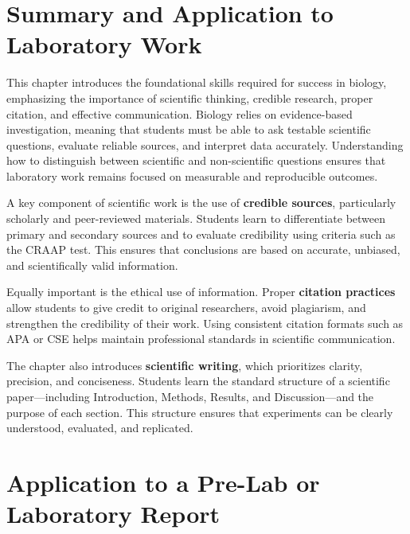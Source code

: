 \documentclass[
  letterpaper,
  DIV=11,
  numbers=noendperiod]{scrreprt}
\begin{document}
\section*{\texorpdfstring{\textbf{Summary and Application to Laboratory
Work}}{Summary and Application to Laboratory Work}}\label{summary-and-application-to-laboratory-work}


This chapter introduces the foundational skills required for success in
biology, emphasizing the importance of scientific thinking, credible
research, proper citation, and effective communication. Biology relies
on evidence-based investigation, meaning that students must be able to
ask testable scientific questions, evaluate reliable sources, and
interpret data accurately. Understanding how to distinguish between
scientific and non-scientific questions ensures that laboratory work
remains focused on measurable and reproducible outcomes.

A key component of scientific work is the use of \textbf{credible
sources}, particularly scholarly and peer-reviewed materials. Students
learn to differentiate between primary and secondary sources and to
evaluate credibility using criteria such as the CRAAP test. This ensures
that conclusions are based on accurate, unbiased, and scientifically
valid information.

Equally important is the ethical use of information. Proper
\textbf{citation practices} allow students to give credit to original
researchers, avoid plagiarism, and strengthen the credibility of their
work. Using consistent citation formats such as APA or CSE helps
maintain professional standards in scientific communication.

The chapter also introduces \textbf{scientific writing}, which
prioritizes clarity, precision, and conciseness. Students learn the
standard structure of a scientific paper---including Introduction,
Methods, Results, and Discussion---and the purpose of each section. This
structure ensures that experiments can be clearly understood, evaluated,
and replicated.

\section*{\texorpdfstring{\textbf{Application to a Pre-Lab or Laboratory
Report}}{Application to a Pre-Lab or Laboratory Report}}\label{application-to-a-pre-lab-or-laboratory-report}
\end{document}

